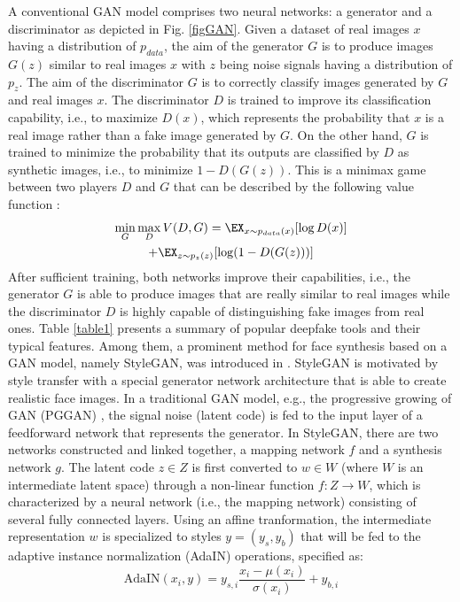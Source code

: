 A conventional GAN model comprises two neural networks: a generator and a discriminator as depicted in Fig. \ref{figGAN}. Given a dataset of real images $x$ having a distribution of $p_{data}$, the aim of the generator $G$ is to produce images $G(z)$ similar to real images $x$ with $z$ being noise signals having a distribution of $p_z$. The aim of the discriminator $G$ is to correctly classify images generated by $G$ and real images $x$. The discriminator $D$ is trained to improve its classification capability, i.e., to maximize $D(x)$, which represents the probability that $x$ is a real image rather than a fake image generated by $G$. On the other hand, $G$ is trained to minimize the probability that its outputs are classified by $D$ as synthetic images, i.e., to minimize $1-D(G(z))$. This is a minimax game between two players $D$ and $G$ that can be described by the following value function :
\begin{multline}
    \min_G \max_D V(D,G)=\EX_{x\sim p_{data}(x)}[\log D(x)] \\ + \EX_{z\sim p_z(z)}[\log (1-D(G(z)))]
\end{multline}
After sufficient training, both networks improve their capabilities, i.e., the generator $G$ is able to produce images that are really similar to real images while the discriminator $D$ is highly capable of distinguishing fake images from real ones.
Table \ref{table1} presents a summary of popular deepfake tools and their typical features. Among them, a prominent method for face synthesis based on a GAN model, namely StyleGAN, was introduced in . StyleGAN is motivated by style transfer  with a special generator network architecture that is able to create realistic face images. In a traditional GAN model, e.g., the progressive growing of GAN (PGGAN) , the signal noise (latent code) is fed to the input layer of a feedforward network that represents the generator. In StyleGAN, there are two networks constructed and linked together, a mapping network $f$ and a synthesis network $g$. The latent code $z \in Z$ is first converted to $w \in W$ (where $W$ is an intermediate latent space) through a non-linear function $f:Z\rightarrow W$, which is characterized by a neural network (i.e., the mapping network) consisting of several fully connected layers. Using an affine tranformation, the intermediate representation $w$ is specialized to styles $y=(y_s,y_b)$ that will be fed to the adaptive instance normalization (AdaIN) operations, specified as: 
\begin{equation}
    \mathrm{AdaIN}(x_i,y)=y_{s,i}\frac{x_i-\mu(x_i)}{\sigma(x_i)}+y_{b,i}
\end{equation}
